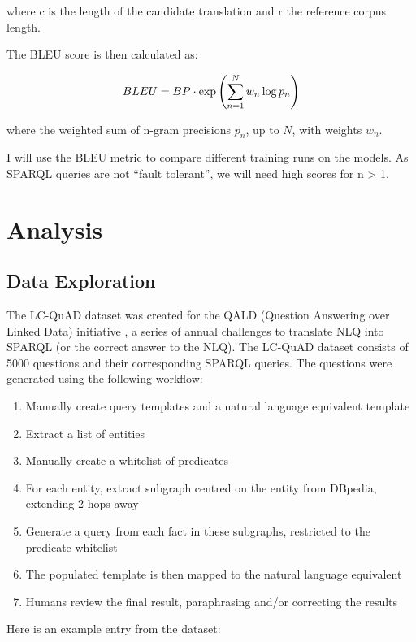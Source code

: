 \documentclass[12pt]{article}
\begin{document}
where c is the length of the candidate translation and r the reference
corpus length.

The BLEU score is then calculated as:

\[ BLEU = BP \cdot {\rm exp} \left( \sum_{n=1}^{N} w_n \log p_n \right) \]

where the weighted sum of n-gram precisions \(p_n\), up to \(N\), with weights \(w_n\).

I will use the BLEU metric to compare different training runs on the models.
As SPARQL queries are not ``fault tolerant'', we will need high scores for n
\textgreater{} 1.

\section{Analysis}\label{ii.-analysis}

\subsection{Data Exploration}\label{data-exploration}

The LC-QuAD dataset \cite{trivedi2017lc} was created
for the QALD (Question Answering over Linked Data) initiative
\cite{QALD}, a series of annual challenges to translate NLQ into SPARQL
(or the correct answer to the NLQ). The LC-QuAD dataset consists of 5000
questions and their corresponding SPARQL queries. The questions were
generated using the following workflow:

\begin{enumerate}
\def\labelenumi{\arabic{enumi}.}
\item
  Manually create query templates and a natural language equivalent
  template
\item
  Extract a list of entities
\item
  Manually create a whitelist of predicates
\item
  For each entity, extract subgraph centred on the entity from DBpedia,
  extending 2 hops away
\item
  Generate a query from each fact in these subgraphs, restricted to the
  predicate whitelist
\item
  The populated template is then mapped to the natural language
  equivalent
\item
  Humans review the final result, paraphrasing and/or correcting the
  results
\end{enumerate}

Here is an example entry from the dataset:
\end{document}
